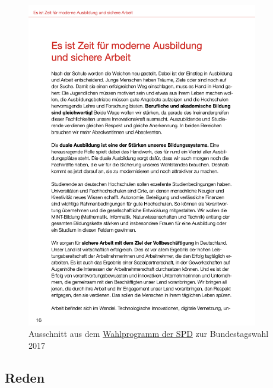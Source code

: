 \begin{figure}[H]
    \centering
    \includegraphics[width=0.9\textwidth]{data/images/appendix/spd_btw17_ausschnitt.png}
    \caption{Ausschnitt aus dem \href{https://www.spd.de/fileadmin/Dokumente/Regierungsprogramm/SPD_Regierungsprogramm_BTW_2017_A5_RZ_WEB.pdf}{ Wahlprogramm der SPD} zur Bundestagswahl 2017}
    \label{fig:partyProgramExapleSpd}
\end{figure}

\subsection*{Reden}

